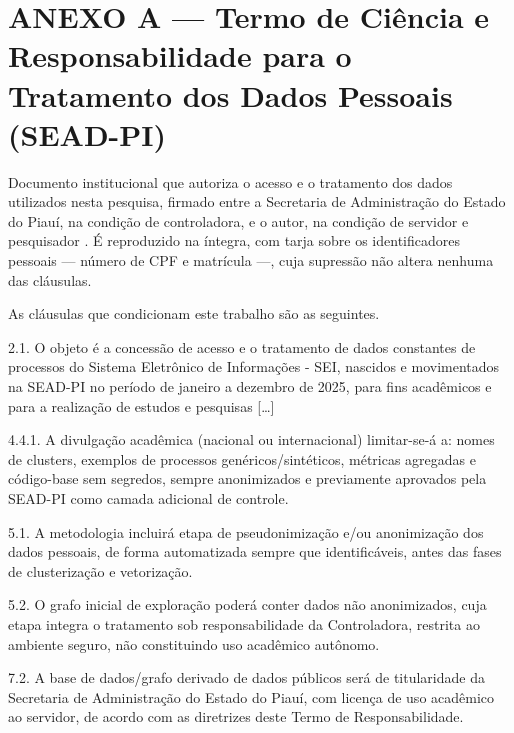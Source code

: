 \newpage
\section*{ANEXO A --- Termo de Ciência e Responsabilidade para o Tratamento dos Dados
Pessoais (SEAD-PI)}

Documento institucional que autoriza o acesso e o tratamento dos dados utilizados nesta
pesquisa, firmado entre a Secretaria de Administração do Estado do Piauí, na condição de
controladora, e o autor, na condição de servidor e pesquisador \cite{seadpi2026termo}. É
reproduzido na íntegra, com tarja sobre os identificadores pessoais --- número de CPF e
matrícula ---, cuja supressão não altera nenhuma das cláusulas.

As cláusulas que condicionam este trabalho são as seguintes.

\begin{citacao}
2.1. O objeto é a concessão de acesso e o tratamento de dados constantes de processos do
Sistema Eletrônico de Informações - SEI, nascidos e movimentados na SEAD-PI no período de
janeiro a dezembro de 2025, para fins acadêmicos e para a realização de estudos e pesquisas
[\ldots]
\end{citacao}

\begin{citacao}
4.4.1. A divulgação acadêmica (nacional ou internacional) limitar-se-á a: nomes de clusters,
exemplos de processos genéricos/sintéticos, métricas agregadas e código-base sem segredos,
sempre anonimizados e previamente aprovados pela SEAD-PI como camada adicional de controle.
\end{citacao}

\begin{citacao}
5.1. A metodologia incluirá etapa de pseudonimização e/ou anonimização dos dados pessoais, de
forma automatizada sempre que identificáveis, antes das fases de clusterização e vetorização.
\end{citacao}

\begin{citacao}
5.2. O grafo inicial de exploração poderá conter dados não anonimizados, cuja etapa integra o
tratamento sob responsabilidade da Controladora, restrita ao ambiente seguro, não constituindo
uso acadêmico autônomo.
\end{citacao}

\begin{citacao}
7.2. A base de dados/grafo derivado de dados públicos será de titularidade da Secretaria de
Administração do Estado do Piauí, com licença de uso acadêmico ao servidor, de acordo com as
diretrizes deste Termo de Responsabilidade.
\end{citacao}

